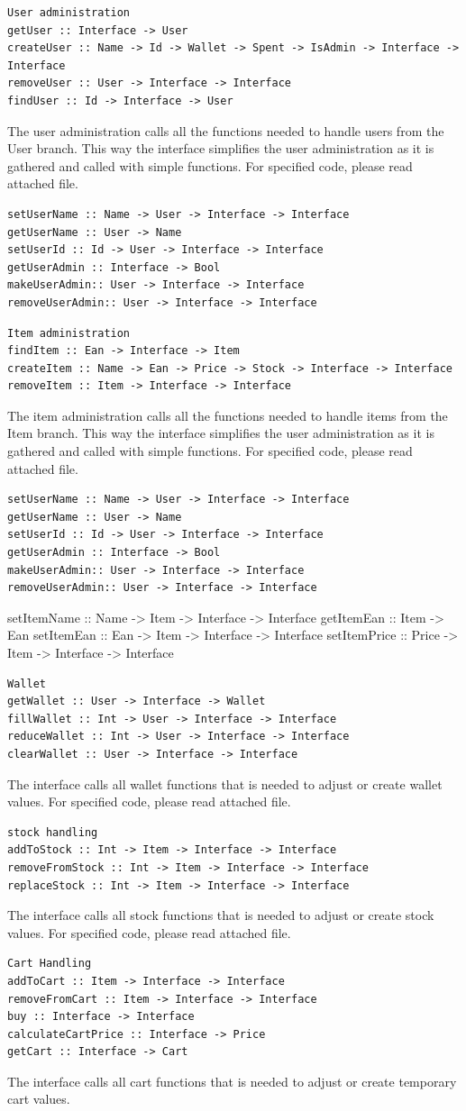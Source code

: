 \documentclass[11pt]{article}
\begin{document}
\begin{lstlisting}
User administration
getUser :: Interface -> User
createUser :: Name -> Id -> Wallet -> Spent -> IsAdmin -> Interface -> Interface
removeUser :: User -> Interface -> Interface
findUser :: Id -> Interface -> User
\end{lstlisting}
The user administration calls all the functions needed to handle users from the User branch. This way the interface simplifies the user administration as it is gathered and called with simple functions. For specified code, please read attached file.
\begin{lstlisting}
setUserName :: Name -> User -> Interface -> Interface
getUserName :: User -> Name
setUserId :: Id -> User -> Interface -> Interface
getUserAdmin :: Interface -> Bool
makeUserAdmin:: User -> Interface -> Interface
removeUserAdmin:: User -> Interface -> Interface
\end{lstlisting}
\begin{lstlisting}
Item administration
findItem :: Ean -> Interface -> Item
createItem :: Name -> Ean -> Price -> Stock -> Interface -> Interface
removeItem :: Item -> Interface -> Interface
\end{lstlisting}
The item administration calls all the functions needed to handle items from the Item branch. This way the interface simplifies the user administration as it is gathered and called with simple functions. For specified code, please read attached file.
\begin{lstlisting}
setUserName :: Name -> User -> Interface -> Interface
getUserName :: User -> Name
setUserId :: Id -> User -> Interface -> Interface
getUserAdmin :: Interface -> Bool
makeUserAdmin:: User -> Interface -> Interface
removeUserAdmin:: User -> Interface -> Interface
\end{lstlisting}
setItemName :: Name -> Item -> Interface -> Interface
getItemEan :: Item -> Ean
setItemEan :: Ean -> Item -> Interface -> Interface
setItemPrice :: Price -> Item -> Interface -> Interface
\begin{lstlisting}
Wallet
getWallet :: User -> Interface -> Wallet
fillWallet :: Int -> User -> Interface -> Interface
reduceWallet :: Int -> User -> Interface -> Interface
clearWallet :: User -> Interface -> Interface
\end{lstlisting}
The interface calls all wallet functions that is needed to adjust or create wallet values. For specified code, please read attached file.
\begin{lstlisting}
stock handling
addToStock :: Int -> Item -> Interface -> Interface
removeFromStock :: Int -> Item -> Interface -> Interface
replaceStock :: Int -> Item -> Interface -> Interface
\end{lstlisting}
The interface calls all stock functions that is needed to adjust or create stock values. For specified code, please read attached file.
\begin{lstlisting}
Cart Handling
addToCart :: Item -> Interface -> Interface
removeFromCart :: Item -> Interface -> Interface
buy :: Interface -> Interface
calculateCartPrice :: Interface -> Price
getCart :: Interface -> Cart
\end{lstlisting}
The interface calls all cart functions that is needed to adjust or create temporary cart values.
\end{document}
